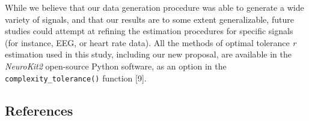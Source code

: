 \documentclass[
  man,floatsintext]{apa6}
\begin{document}
While we believe that our data generation procedure was able to generate a wide variety of signals, and that our results are to some extent generalizable, future studies could attempt at refining the estimation procedures for specific signals (for instance, EEG, or heart rate data). All the methods of optimal tolerance \emph{r} estimation used in this study, including our new proposal, are available in the \emph{NeuroKit2} open-source Python software, as an option in the \texttt{complexity\_tolerance()} function {[}9{]}.

\newpage

\hypertarget{references}{%
\subsection{References}\label{references}}
\end{document}
